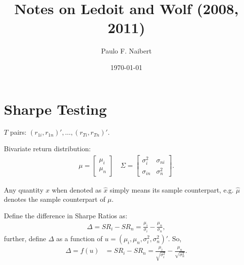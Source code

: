 \documentclass[12pt,oneside,a4paper]{article}
\begin{document}
\title{Notes on Ledoit and Wolf (2008, 2011)}
\author{Paulo F. Naibert}
\date{\today}

\maketitle

\thispagestyle{headings}
\section{Sharpe Testing}
\cite{lw2008-sr}

$T$ pairs: $(r_{1i}, r_{1n})', \dots, (r_{Ti}, r_{Tn})'$.

% 

Bivariate return distribution:
\begin{align*}
\mu=
\begin{bmatrix}
\mu_{i} \\ \mu_{n}
\end{bmatrix}
\quad
\Sigma=
\begin{bmatrix}
\sigma_{i}^2 & \sigma_{ni}
\\
\sigma_{in} & \sigma_{n}^2
\end{bmatrix}.
\end{align*}

Any quantity $x$ when denoted as $\hat{x}$ simply means its sample counterpart, e.g. $\hat{\mu}$ denotes the sample counterpart of $\mu$.

Define the difference in Sharpe Ratios as:
\begin{align}
	\Delta = SR_{i} - SR_{n} = \frac{\mu_{i}}{\sigma_{i}} - \frac{\mu_{n}}{\sigma_{n}},
\end{align}
further, define $\Delta$ as a function of $u = (\mu_{i}, \mu_{n}, \sigma^2_{i}, \sigma^2_{n})'$.
So,
\begin{align}
\Delta = f(u) &= SR_{i} - SR_{n} 
= \frac{\mu_{i}}{\sqrt{\sigma^2_{i}}} - \frac{\mu_{n}}{\sqrt{\sigma^2_{n}}}.
\end{align}
\end{document}
